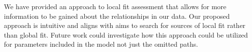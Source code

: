 \documentclass[man, noextraspace, floatsintext, 12pt]{apa7}
\begin{document}
We have provided an approach to local fit assessment that allows for more information to be gained about the relationships in our data.
Our proposed approach is intuitive and aligns with aims to search for sources of local fit rather than global fit.
Future work could investigate how this approach could be utilized for parameters included in the model not just the omitted paths.

\newpage
\raggedright
% 
%
\printbibliography
%
%
\end{document}
